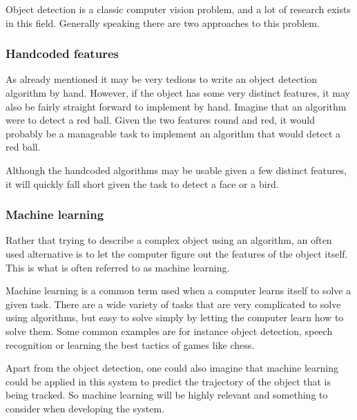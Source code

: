 Object detection is a classic computer vision problem, and a lot of research exists in this field.
Generally speaking there are two approaches to this problem.

\subsubsection{Handcoded features}
As already mentioned it may be very tedious to write an object detection algorithm by hand.
However, if the object has some very distinct features, it may also be fairly straight forward to implement by hand.
Imagine that an algorithm were to detect a red ball. 
Given the two features round and red, it would probably be a manageable task to implement an algorithm that would detect a red ball.

Although the handcoded algorithms may be usable given a few distinct features, it will quickly fall short given the task to detect a face or a bird.

\subsubsection{Machine learning}
Rather that trying to describe a complex object using an algorithm, an often used alternative is to let the computer figure out the features of the object itself.
This is what is often referred to as machine learning.

Machine learning is a common term used when a computer learns itself to solve a given task\cite{MachineLearningWiki}.
There are a wide variety of tasks that are very complicated to solve using algorithms, but easy to solve simply by letting the computer learn how to solve them. 
Some common examples are for instance object detection, speech recognition or learning the best tactics of games like chess.

Apart from the object detection, one could also imagine that machine learning could be applied in this system to predict the trajectory of the object that is being tracked.
So machine learning will be highly relevant and something to consider when developing the system.